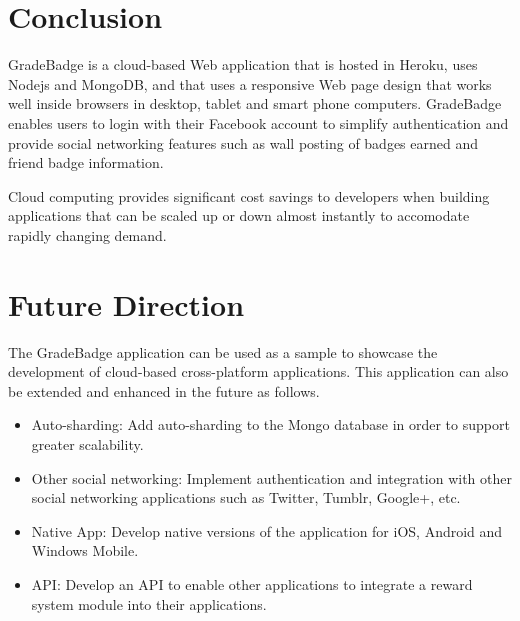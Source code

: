 
\section{Conclusion}

GradeBadge is a cloud-based Web application that is hosted in Heroku, uses Nodejs and MongoDB, and that uses a responsive Web page design that works well inside browsers in desktop, tablet and smart phone computers. GradeBadge enables users to login with their Facebook account to simplify authentication and provide social networking features such as wall posting of badges earned and friend badge information. 

Cloud computing provides significant cost savings to developers when building applications that can be scaled up or down almost instantly to accomodate rapidly changing demand.

\section{Future Direction}

The GradeBadge application can be used as a sample to showcase the development of cloud-based cross-platform applications. This application can also be extended and enhanced in the future as follows. 

\begin{itemize}
\item Auto-sharding: Add auto-sharding to the Mongo database in order to support greater scalability. 
\item Other social networking: Implement authentication and integration with other social networking applications such as Twitter, Tumblr, Google+,  etc. 
\item Native App: Develop native versions of the application for iOS, Android and Windows Mobile.
\item API: Develop an API to enable other applications to integrate a reward system module into their applications.
\end{itemize}

